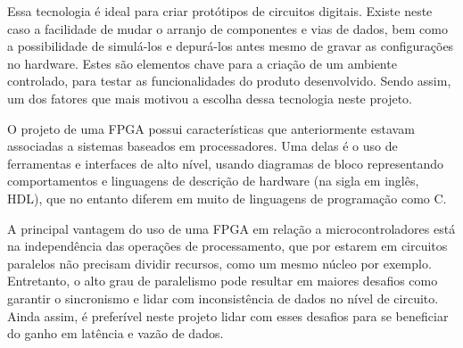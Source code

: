 	Essa tecnologia é ideal para criar protótipos de circuitos digitais. Existe neste caso a facilidade de mudar o arranjo de componentes e vias de dados, bem como a possibilidade de simulá-los e depurá-los antes mesmo de gravar as configurações no hardware. Estes são elementos chave para a criação de um ambiente controlado, para testar as funcionalidades do produto desenvolvido. Sendo assim, um dos fatores que mais motivou a escolha dessa tecnologia neste projeto.
	
	O projeto de uma FPGA possui características que anteriormente estavam associadas a sistemas baseados em processadores. Uma delas é o uso de ferramentas e interfaces de alto nível, usando diagramas de bloco representando comportamentos e linguagens de descrição de hardware (na sigla em inglês, HDL), que no entanto diferem em muito de linguagens de programação como C. 
	
	A principal vantagem do uso de uma FPGA em relação a microcontroladores está na independência das operações de processamento, que por estarem em circuitos paralelos não precisam dividir recursos, como um mesmo núcleo por exemplo. Entretanto, o alto grau de paralelismo pode resultar em maiores desafios como garantir o sincronismo e lidar com inconsistência de dados no nível de circuito. Ainda assim, é preferível neste projeto lidar com esses desafios para se beneficiar do ganho em latência e vazão de dados.
	
	
	
